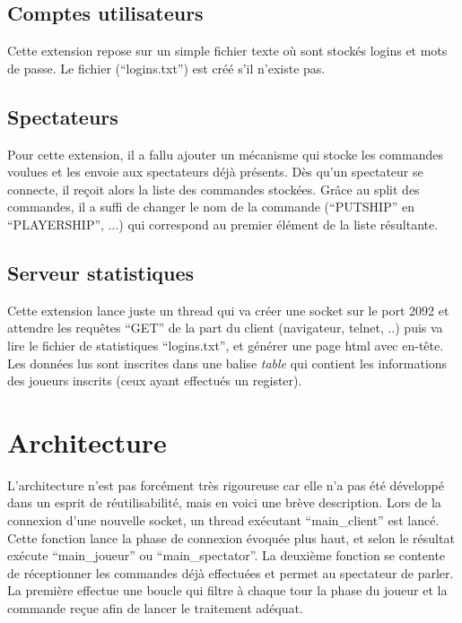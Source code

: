 \documentclass[a4paper, 11pt]{report}
\begin{document}
\subsection{Comptes utilisateurs}

Cette extension repose sur un simple fichier texte où sont stockés logins et mots de passe. Le fichier (``logins.txt'') est créé s'il n'existe pas.

\subsection{Spectateurs}

Pour cette extension, il a fallu ajouter un mécanisme qui stocke les commandes voulues et les envoie aux spectateurs déjà présents. Dès qu'un spectateur se connecte, il reçoit alors la liste des commandes stockées. Grâce au split des commandes, il a suffi de changer le nom de la commande (``PUTSHIP'' en ``PLAYERSHIP'', ...) qui correspond au premier élément de la liste résultante.

\subsection{Serveur statistiques}

Cette extension lance juste un thread qui va créer une socket sur le port 2092 et attendre les requêtes ``GET''
de la part du client (navigateur, telnet, ..) puis va lire le fichier de statistiques ``logins.txt'', 
et générer une page html avec en-tête. Les données lus sont inscrites dans une balise \emph{table}
qui contient les informations des joueurs inscrits (ceux ayant effectués un register).

\section{Architecture}

L'architecture n'est pas forcément très rigoureuse car elle n'a pas été développé dans un esprit de réutilisabilité, mais en voici une brève description.
Lors de la connexion d'une nouvelle socket, un thread exécutant ``main\_client'' est lancé. Cette fonction lance la phase de connexion évoquée plus haut, et selon le résultat exécute ``main\_joueur'' ou ``main\_spectator''. La deuxième fonction se contente de réceptionner les commandes déjà effectuées et permet au spectateur de parler. La première effectue une boucle qui filtre à chaque tour la phase du joueur et la commande reçue afin de lancer le traitement adéquat.
\end{document}
